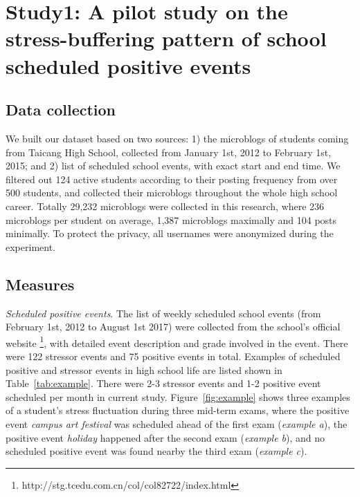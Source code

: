 \section{Study1: A pilot study on the stress-buffering pattern of school scheduled positive events}
\label{sec:study1}
\subsection{Data collection}
We built our dataset based on two sources: 1) the microblogs of students coming from Taicang High School,
collected from January 1st, 2012 to February 1st, 2015;
and 2) list of scheduled school events, with exact start and end time.
We filtered out 124 active students according to their posting frequency from over 500 students,
and collected their microblogs throughout the whole high school career.
Totally 29,232 microblogs were collected in this research,
where 236 microblogs per student on average, 1,387 microblogs maximally and 104 posts minimally.
To protect the privacy, all usernames were anonymized during the experiment.

\begin{table}[H]
\caption{\small{Examples of school scheduled positive and stressor events.}}
\label{tab:example}
\end{table}

\subsection{Measures}
\emph{Scheduled positive events}.
The list of weekly scheduled school events (from February 1st, 2012 to August 1st 2017) were collected from the school's official website
\footnote{http://stg.tcedu.com.cn/col/col82722/index.html},
with detailed event description and grade involved in the event.
There were 122 stressor events and 75 positive events in total.
Examples of scheduled positive and stressor events in high school life are listed shown in Table~\ref{tab:example}.
There were 2-3 stressor events and 1-2 positive event scheduled per month in current study.
Figure~\ref{fig:example} shows three examples of a student's stress fluctuation during three mid-term exams,
where the positive event \emph{campus art festival} was scheduled ahead of the first exam (\emph{example a}),
the positive event \emph{holiday} happened after the second exam (\emph{example b}),
and no scheduled positive event was found nearby the third exam (\emph{example c}).

